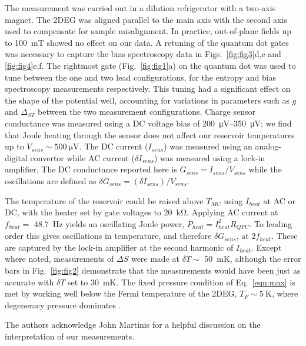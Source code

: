 \documentclass[twocolumn,showpacs,amsmath,amssymb,prl,aps,superscriptaddress]{revtex4-1}
\begin{document}
The measurement was carried out in a dilution refrigerator with a two-axis magnet. The 2DEG was aligned parallel to the main axis with the second axis used to compensate for sample misalignment. In practice, out-of-plane fields up to \SI{100}{\milli\tesla} showed no effect on our data. A retuning of the quantum dot gates was necessary to capture the bias spectroscopy data in Figs.~\ref{fig:fig3}d,e and \ref{fig:fig4}e,f. The rightmost gate (Fig.~\ref{fig:fig1}a) on the quantum dot was used to tune between the one and two lead configurations, for the entropy and bias spectroscopy measurements respectively. This tuning had a significant effect on the shape of the potential well, accounting for variations in parameters such as $g$ and $\Delta_{ST}$ between the two measurement configurations.  Charge sensor conductance was measured using a DC voltage bias of \SIrange{200}{350}{\micro\volt}; we find that Joule heating through the sensor does not affect our reservoir temperatures up to $V_{sens}\sim\SI{500}{\micro\volt}$. The DC current ($I_{sens}$) was measured using an analog-digital convertor while AC current ($\delta I_{sens}$) was measured using a lock-in amplifier. The DC conductance reported here is $G_{sens}=I_{sens}/V_{sens}$ while the oscillations are defined as $\delta G_{sens}=(\delta I_{sens})/V_{sens}$.

The temperature of the reservoir could be raised above $T_{MC}$ using $I_{heat}$ at AC or DC, with the heater set by gate voltages to \SI{20}{\kilo\ohm}. Applying AC current at $f_{heat} =$ \SI{48.7}{\hertz} yields an oscillating Joule power, $P_{heat} = I^2_{heat}R_{QPC}$. To leading order this gives oscillations in temperature, and therefore $\delta G_{sens}$, at $2f_{heat}$.  These are  captured by the lock-in amplifier at the second harmonic of $I_{heat}$.  Except where noted, measurements of $\Delta S$ were made at $\delta T \sim $ \SI{50}{\milli\kelvin}, although the error bars in Fig.~\ref{fig:fig2} demonstrate that the measurements would have been just as accurate with $\delta T$ set to \SI{30}{\milli\kelvin}. The fixed pressure condition of Eq.~\ref{eqn:max} is met by working well below the Fermi temperature of the 2DEG, $T_F \sim \SI{5}{\kelvin}$, where degeneracy pressure dominates \cite{Landau1969}.

\acknowledgments
The authors acknowledge John Martinis for a helpful discussion on the interpretation of our measurements.

{}

\end{document}
